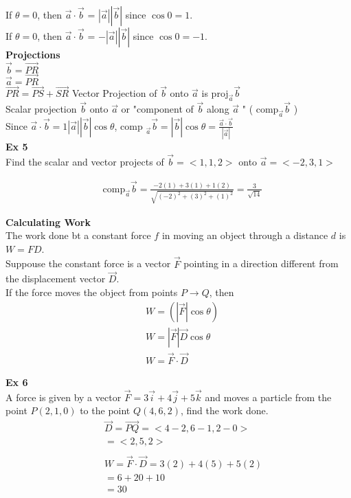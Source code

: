 \documentclass{article}
\begin{document}
  If $ \theta = 0 $, then $ \vec{ a } \cdot \vec{ b }   $ = $ | \vec{ a }  |  | \vec{ b }  |$ since $ \cos{0} = 1$.\\
  If $ \theta = 0 $, then $ \vec{ a } \cdot \vec{ b }   $ = $ -| \vec{ a }  |  | \vec{ b }  |$ since $ \cos{0} = -1$.\\
  \textbf{Projections}\\
  $ \vec{ b } = \vec{ PR }   $\\
  $ \vec{ a } = \vec{ PR }   $ \\
  $ \vec{ PR } = \vec{ PS } + \vec{ SR }   $
  Vector Projection of $ \vec{ b }  $ onto $\vec{ a }$ is proj$ _{ \vec{ a } } \vec{ b }    $\\
  Scalar projection $ \vec{ b }  $ onto $ \vec{ a }  $ or "component of $ \vec{ b }  $ along $ \vec{ a }  $  " ( comp$ _{ \vec{ a } } \vec{ b }   $ )  \\
Since $ \vec{ a }  \cdot \vec{ b }  = 1 | \vec{ a }  | | \vec{ b }  | \cos{\theta} $, comp $ _{ \vec{ a }}  \vec{ b } = | \vec{ b } | \cos{\theta} = \frac{ \vec{ a } \cdot \vec{ b }   }{ | \vec{ a }  | }  $\\
\textbf{Ex 5}\\
Find the scalar and vector projects of $  \vec{ b } = < 1, 1, 2>   $ onto $ \vec{ a } = < -2, 3, 1>   $   

\[
  \begin{aligned}
  &	\text{comp} _{ \vec{ a } }\vec{ b } = \frac{ -2(1) + 3(1) + 1(2)}{ \sqrt{ (-2) ^{2} + (3)^2 + (1)^2  }} = \boxed{ \frac{ 3 }{ \sqrt{ 14 }   } }
  \end{aligned}
\]

\textbf{Calculating Work}\\
The work done bt a constant force $ f $  in moving an object through a distance $ d $  is $ W=FD $.\\
Suppouse the constant force is a vector $ \vec{ F }  $ pointing in a direction different from the displacement vector $\vec{ D }$.\\
If the force moves the object from points $ P \to Q $, then
\[
  \begin{aligned}
  & W= ( | \vec{ F }  | \cos{\theta})\\ 
  & W = | \vec{ F }  | \vec{ D } \cos{ \theta}\\
  & W = \vec{ F } \cdot \vec{ D }  
  \end{aligned}
\]

\textbf{Ex 6}\\
A force is given by a vector $ \vec{ F } = 3 \vec{ i } + 4 \vec{ j } + 5 \vec{ k } $ and moves a particle from the point $ P (2,1,0) $ to the point $ Q(4,6,2) $, find the work done.
\[
  \begin{aligned}
  &	\vec{ D } = \vec{ PQ } = < 4-2, 6-1, 2-0>\\
  & = < 2, 5, 2>\\
  ~\\
  & W = \vec{ F } \cdot \vec{ D } = 3(2) + 4(5) + 5(2) \\
  & = 6 + 20 + 10\\
  & = \boxed{30}
  \end{aligned}
\]

 
\end{document}

